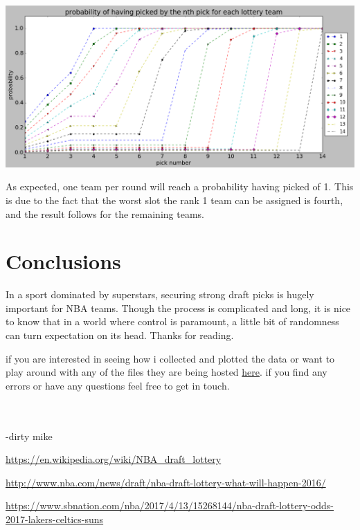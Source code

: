\documentclass[letterpaper,12pt]{article}
\begin{document}
\begin{center}
\includegraphics[scale=0.5]{../images/plot2.png} 
\end{center} \newpage

As expected, one team per round will reach a probability having picked of 1. This is due to the fact that the worst slot the rank 1 team can be assigned is fourth, and the result follows for the remaining teams. 

\section{Conclusions}
In a sport dominated by superstars, securing strong draft picks is hugely important for NBA teams. Though the process is complicated and long, it is nice to know that in a world where control is paramount, a little bit of randomness can turn expectation on its head. Thanks for reading.\begin{footnote}{ if you are interested in seeing how i collected and plotted the data or want to play around with any of the files they are being hosted \href{https://github.com/michaelneuder/nba_draft}{here}. if you find any errors or have any questions feel free to get in touch.}\end{footnote} \\ \\ 
-dirty mike


\newpage
\begin{thebibliography}{99}

\url{https://en.wikipedia.org/wiki/NBA_draft_lottery}

\url{http://www.nba.com/news/draft/nba-draft-lottery-what-will-happen-2016/}

\url{https://www.sbnation.com/nba/2017/4/13/15268144/nba-draft-lottery-odds-2017-lakers-celtics-suns}

\end{thebibliography}
\end{document}
